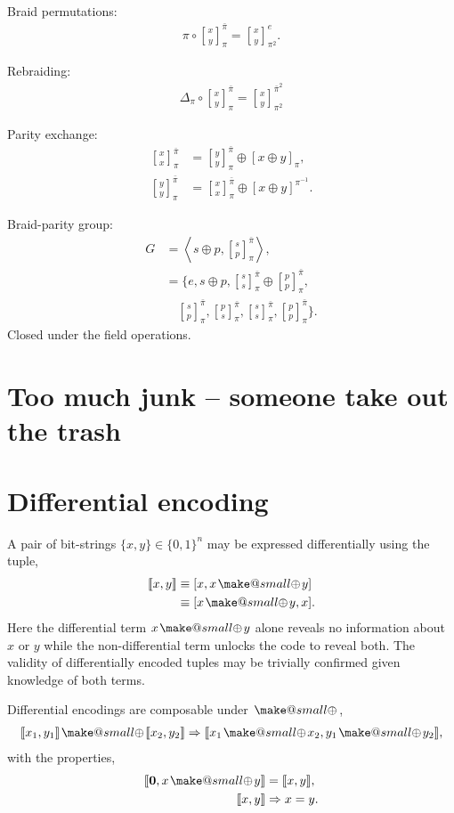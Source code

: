 \documentclass[twocolumn, aps, amsmath, amssymb, nofootinbib, superscriptaddress, longbibliography, doublefloatfix, table-of-contents, eqsecnum, rmp]{revtex4-2}
\makeatletter
\def\zerovec{\mathbf{0}}
\def\diff#1#2{\llbracket #1,#2\rrbracket}
\newcommand{\stackbraid}[2]{{\genfrac{[}{]}{0pt}{}{{#1}}{{#2}}}^{\bar{\pi}}_{\pi}}
\newcommand{\stackbraidpow}[3]{{\genfrac{[}{]}{0pt}{}{{#1}}{{#2}}}^{\bar{\pi}^{#3}}_{\pi^#3}}
\newcommand{\stackbraidgen}[4]{{\genfrac{[}{]}{0pt}{}{{#1}}{{#2}}}^{#3}_{#4}}
\newcommand{\soplus}{{{\hspace{1pt}}{\mathbin{\mathpalette\make@small{\mathbin\oplus}}}}{\hspace{1pt}}}
\newcommand{\make@small}[2]{%
  \vcenter{\hbox{%
    \scalebox{0.6}{$\m@th#1#2$}%
  }}%
}
\makeatother
\begin{document}
Braid permutations:
\begin{align}
	\pi \circ \stackbraid{x}{y} = \stackbraidgen{x}{y}{e}{\pi^2}.
\end{align}

Rebraiding:
\begin{align}
	\Delta_\pi \circ \stackbraid{x}{y} = \stackbraidpow{x}{y}{2}
\end{align}

Parity exchange:
\begin{align}
	\stackbraid{x}{x} &= \stackbraid{y}{y} \oplus [x\oplus y]_\pi,\nonumber\\
	\stackbraid{y}{y} &= \stackbraid{x}{x} \oplus [x\oplus y]^{\pi^{-1}}.
\end{align}


Braid-parity group:
\begin{align}
	G &= \left\langle s\oplus p, \stackbraid{s}{p} \right\rangle,\nonumber\\
	&= \{e, s\oplus p, \stackbraid{s}{s} \oplus \stackbraid{p}{p},\nonumber\\
	&\quad \stackbraid{s}{p}, \stackbraid{p}{s}, \stackbraid{s}{s}, \stackbraid{p}{p} \}.
\end{align}
Closed under the field operations.

\newpage

\section{Too much junk -- someone take out the trash}

\section{Differential encoding}

A pair of bit-strings $\{x,y\}\in\{0,1\}^n$ may be expressed differentially using the tuple,
\begin{align}
	\diff{x}{y} &\equiv [x,x\soplus y] \nonumber\\
	&\equiv [x\soplus y,x].
\end{align}
Here the differential term $x\soplus y$ alone reveals no information about $x$ or $y$ while the non-differential term unlocks the code to reveal both. The validity of differentially encoded tuples may be trivially confirmed given knowledge of both terms.

Differential encodings are composable under $\soplus$,
\begin{align}
	\diff{x_1}{y_1} \soplus \diff{x_2}{y_2} \Rightarrow \diff{x_1\soplus x_2}{y_1 \soplus y_2},
\end{align}
with the properties,
\begin{align}
	\diff{\zerovec}{x\soplus y} &= \diff{x}{y}, \nonumber\\
	\diff{x}{y} &\Rightarrow x=y.
\end{align}
\end{document}

